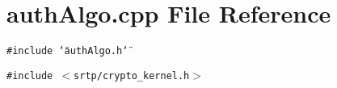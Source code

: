 \section{auth\-Algo.cpp File Reference}
\label{authAlgo_8cpp}
{\tt \#include \char`\"{}auth\-Algo.h\char`\"{}}\par
{\tt \#include $<$srtp/crypto\_\-kernel.h$>$}\par
